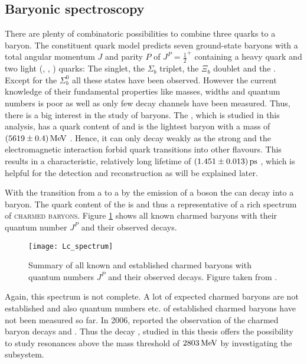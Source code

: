 \subsection{Baryonic spectroscopy}
There are plenty of combinatoric possibilities to combine three quarks to a baryon.
The constituent quark model predicts seven ground-state baryons with a total angular momentum $J$ and parity $P$ of $J^P = \frac{1}{2}^+$ containing a heavy \bquark quark and two light (\uquark, \dquark, \cquark) quarks: 
The \Lb singlet, the $\Sigma_b$ triplet, the $\Xi_b$ doublet and the \Omegab \cite{LHCb_Dph}.
Except for the $\Sigma_b^0$ all these states have been observed.
However the current knowledge of their fundamental properties like masses, widths and quantum numbers is poor as well as only few decay channels have been measured.
Thus, there is a big interest in the study of \bquark baryons.
The \Lb, which is studied in this analysis, has a quark content of \uquark\dquark\bquark and is the lightest \bquark baryon with a mass of $(5619 \pm 0.4) \mathrm{\,Me\kern -0.1em V}$ \cite{PDG}.
Hence, it can only decay weakly as the strong and the electromagnetic interaction forbid quark transitions into other flavours.
This results in a characteristic, relatively long lifetime of $(1.451 \pm 0.013){\rm \,ps}$ \cite{PDG}, which is helpful for the detection and reconstruction as will be explained later.

With the transition from a \bquark to a \cquark by the emission of a \Wm boson the \Lb can decay into a \Lc baryon.
The quark content of the \Lc is \uquark\dquark\cquark and thus a representative of a rich spectrum of \textsc{charmed baryons}.
Figure \ref{fig:Lc_spectrum} shows all known charmed baryons with their quantum number $J^P$ and their observed decays.
\begin{figure}[ptb]
    \centering
	\texttt{[image: Lc\_spectrum]}	
	\caption{Summary of all known and established charmed baryons with quantum numbers $J^P$ and their observed decays. Figure taken from \cite{PDG}.}
	\label{fig:Lc_spectrum}
\end{figure}
Again, this spectrum is not complete.
A lot of expected charmed baryons are not established and also quantum numbers etc. of established charmed baryons have not been measured so far.
In 2006, \babar reported the observation of the charmed baryon decays \decay{\LcResI}{\Dz\proton} and \decay{\LcResII}{\Dz\proton} \cite{BaBar_D0p}.
Thus the decay \LbToDpmunuX, studied in this thesis offers the possibility to study \Lc resonances above the \Dz\proton mass threshold of $2803\mathrm{\,Me\kern -0.1em V}$ by investigating the \Dz\proton subsystem.

